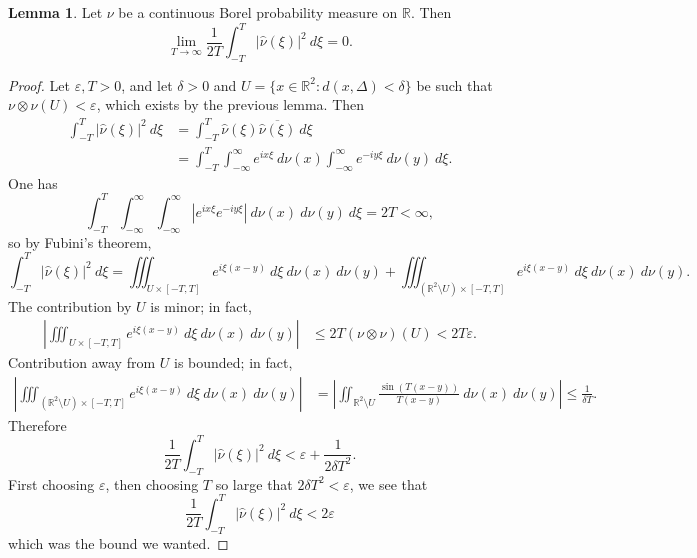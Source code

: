 \documentclass[10pt]{article}
\newcommand{\RR}{\mathbb{R}}
\theoremstyle{definition}
\newtheorem{lemma}{Lemma}[exer]
\begin{document}
\begin{lemma}
Let $\nu$ be a continuous Borel probability measure on $\RR$. Then
$$\lim_{T \to \infty} \frac{1}{2T} \int_{-T}^T |\hat \nu(\xi)|^2~d\xi = 0.$$
\end{lemma}
\begin{proof}
Let $\varepsilon, T > 0$, and let $\delta > 0$ and $U = \{x \in \RR^2: d(x, \Delta) < \delta\}$ be such that $\nu \otimes \nu(U) < \varepsilon$, which exists by the previous lemma.
Then
\begin{align*}
\int_{-T}^T |\hat \nu(\xi)|^2 ~d\xi &= \int_{-T}^T \hat \nu(\xi) \overline{\hat \nu(\xi)}~d\xi \\
&= \int_{-T}^T \int_{-\infty}^\infty e^{ix\xi} ~d\nu(x) \int_{-\infty}^\infty e^{-iy\xi} ~d\nu(y)~d\xi.
\end{align*}
One has
$$\int_{-T}^T \int_{-\infty}^\infty\int_{-\infty}^\infty |e^{ix\xi} e^{-iy\xi}|  ~d\nu(x) ~d\nu(y)~d\xi = 2T < \infty,$$
so by Fubini's theorem,
$$\int_{-T}^T |\hat \nu(\xi)|^2 ~d\xi = \iiint_{U \times [-T, T]} e^{i\xi(x-y)}~d\xi ~d\nu(x) ~d\nu(y) + \iiint_{(\RR^2 \setminus U) \times [-T, T]} e^{i\xi(x-y)}~d\xi ~d\nu(x) ~d\nu(y).$$
The contribution by $U$ is minor; in fact,
\begin{align*}
\left|\iiint_{U \times [-T, T]} e^{i\xi(x-y)}~d\xi ~d\nu(x) ~d\nu(y)\right| &\leq 2T (\nu \otimes \nu)(U) < 2T\varepsilon.
\end{align*}
Contribution away from $U$ is bounded; in fact,
\begin{align*}
\left|\iiint_{(\RR^2 \setminus U) \times [-T, T]} e^{i\xi(x-y)}~d\xi ~d\nu(x) ~d\nu(y)\right| &= \left|\iint_{\RR^2 \setminus U} \frac{\sin(T(x-y))}{T(x-y)}~d\nu(x)~d\nu(y)\right| \leq \frac{1}{\delta T}.
\end{align*}
Therefore
$$\frac{1}{2T} \int_{-T}^T |\hat \nu(\xi)|^2~d\xi < \varepsilon + \frac{1}{2\delta T^2}.$$
First choosing $\varepsilon$, then choosing $T$ so large that $2\delta T^2 < \varepsilon$, we see that
$$\frac{1}{2T} \int_{-T}^T |\hat \nu(\xi)|^2~d\xi < 2\varepsilon$$
which was the bound we wanted.
\end{proof}
\end{document}
